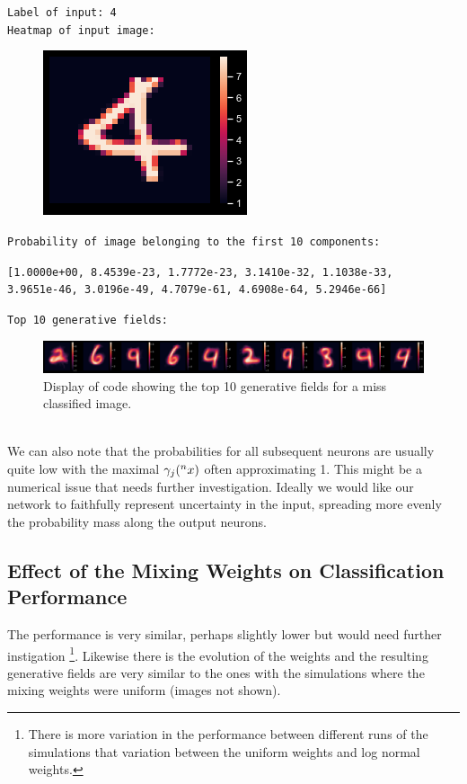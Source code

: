 \documentclass{article}
\begin{document}
\pagebreak

\texttt{Label of input:  4\\}
\texttt{Heatmap of input image:\\}
\begin{figure}[!h]
    \includegraphics[scale=0.3]{img/output_51_1.png}
\end{figure}

\texttt{Probability of image belonging to the first 10 components:}

\texttt{[1.0000e+00, 8.4539e-23, 1.7772e-23, 3.1410e-32, 1.1038e-33,\\ 
		3.9651e-46, 3.0196e-49, 4.7079e-61, 4.6908e-64, 5.2946e-66]}

\texttt{Top 10 generative fields:}
\begin{figure}[h]
    \includegraphics[width=\textwidth]{img/output_51_4.png}
    \caption{Display of code showing the top 10 generative fields for a miss classified image. \label{ts}}
\end{figure}\\

We can also note that the probabilities for all subsequent neurons are usually quite low with the maximal \(\gamma_j(\prescript{n}{}{x})\) often approximating 1. This might be a numerical issue that needs further investigation. Ideally we would like our network to faithfully represent uncertainty in the input, spreading more evenly the probability mass along the output neurons. 

\subsection{Effect of the Mixing Weights on Classification Performance}
The performance is very similar, perhaps slightly lower but would need further instigation \footnote{There is more variation in the performance between different runs of the simulations that variation between the uniform weights and log normal weights.}. Likewise there is the evolution of the weights and the resulting generative fields are very similar to the ones with the simulations where the mixing weights were uniform (images not shown).
\end{document}
